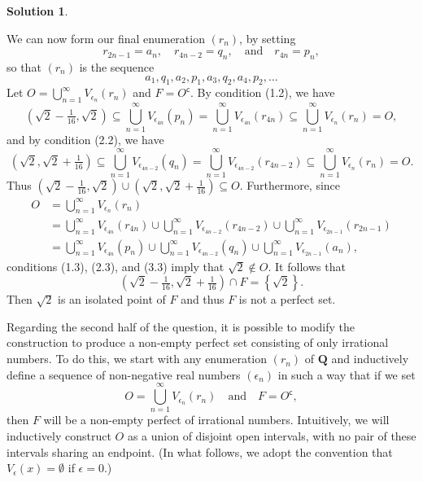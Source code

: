 \documentclass[12pt]{article}
\theoremstyle{definition}
\theoremstyle{exercise}
\theoremstyle{solution}
\newtheorem*{solution}{Solution}
\newcommand{\setcomp}[1]{#1^{\mathsf{c}}}
\newcommand{\quand}{\quad \text{and} \quad}
\newcommand{\Q}{\mathbf{Q}}
\begin{document}
\begin{solution}
\begin{enumerate}
        We can now form our final enumeration \( (r_n) \), by setting
        \[
            r_{2n-1} = a_n, \quad r_{4n-2} = q_n, \quand r_{4n} = p_n,
        \]
        so that \( (r_n) \) is the sequence
        \[
                a_1, q_1, a_2, p_1, a_3, q_2, a_4, p_2, \ldots
        \]
        Let \( O = \bigcup_{n=1}^{\infty} V_{\epsilon_n}(r_n) \) and \( F = \setcomp{O} \). By condition (1.2), we have
        \[
            \left( \sqrt{2} - \tfrac{1}{16}, \sqrt{2} \right) \subseteq \bigcup_{n=1}^{\infty} V_{\epsilon_{4n}}(p_n) = \bigcup_{n=1}^{\infty} V_{\epsilon_{4n}}(r_{4n}) \subseteq \bigcup_{n=1}^{\infty} V_{\epsilon_n}(r_n) = O,
        \]
        and by condition (2.2), we have
        \[
            \left( \sqrt{2}, \sqrt{2} + \tfrac{1}{16} \right) \subseteq \bigcup_{n=1}^{\infty} V_{\epsilon_{4n-2}}(q_n) = \bigcup_{n=1}^{\infty} V_{\epsilon_{4n-2}}(r_{4n-2}) \subseteq \bigcup_{n=1}^{\infty} V_{\epsilon_n}(r_n) = O.
        \]
        Thus \( \left( \sqrt{2} - \tfrac{1}{16}, \sqrt{2} \right) \cup \left( \sqrt{2}, \sqrt{2} + \tfrac{1}{16} \right) \subseteq O \). Furthermore, since
        \begin{align*}
            O &= \bigcup_{n=1}^{\infty} V_{\epsilon_n}(r_n) \\
            &= \bigcup_{n=1}^{\infty} V_{\epsilon_{4n}}(r_{4n}) \cup \bigcup_{n=1}^{\infty} V_{\epsilon_{4n-2}}(r_{4n-2}) \cup \bigcup_{n=1}^{\infty} V_{\epsilon_{2n-1}}(r_{2n-1}) \\
            &= \bigcup_{n=1}^{\infty} V_{\epsilon_{4n}}(p_n) \cup \bigcup_{n=1}^{\infty} V_{\epsilon_{4n-2}}(q_n) \cup \bigcup_{n=1}^{\infty} V_{\epsilon_{2n-1}}(a_n),
        \end{align*}
        conditions (1.3), (2.3), and (3.3) imply that \( \sqrt{2} \not\in O \). It follows that
        \[
            \left( \sqrt{2} - \tfrac{1}{16}, \sqrt{2} + \tfrac{1}{16} \right) \cap F = \left\{ \sqrt{2} \right\}.
        \]
        Then \( \sqrt{2} \) is an isolated point of \( F \) and thus \( F \) is not a perfect set.

        \noindent \hrulefill

        Regarding the second half of the question, it is possible to modify the construction to produce a non-empty perfect set consisting of only irrational numbers. To do this, we start with any enumeration \( (r_n) \) of \( \Q \) and inductively define a sequence of non-negative real numbers \( (\epsilon_n) \) in such a way that if we set
        \[
            O = \bigcup_{n=1}^{\infty} V_{\epsilon_n}(r_n) \quand F = \setcomp{O},
        \]
        then \( F \) will be a non-empty perfect of irrational numbers. Intuitively, we will inductively construct \( O \) as a union of disjoint open intervals, with no pair of these intervals sharing an endpoint. (In what follows, we adopt the convention that \( V_{\epsilon}(x) = \emptyset \) if \( \epsilon = 0 \).)


\end{enumerate}
\end{solution}
\end{document}
